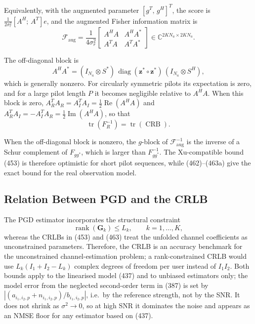 \documentclass[12pt,a4paper]{article}
\begin{document}
Equivalently, with the augmented parameter $[g^T,\,g^H]^T$, the score is
$\frac{1}{2\sigma_r^2}[A^H;\,A^T]e$, and the augmented Fisher
information matrix is
\begin{equation}
\boxed{
\mathcal F_{\mathrm{aug}}
=
\frac{1}{4\sigma_r^2}
\begin{bmatrix}
A^HA & A^HA^*\\
A^TA & A^TA^*
\end{bmatrix}
\in\mathbb C^{2KN_a\times 2KN_a}.
}
\tag{464}
\end{equation}

The off-diagonal block is
\begin{equation}
A^HA^*
=
(I_{N_a}\otimes S^*)\,
\operatorname{diag}(\mathbf z^*\circ\mathbf z^*)\,
(I_{N_a}\otimes S^H),
\tag{464a}
\end{equation}
which is generally nonzero. For circularly symmetric pilots its expectation
is zero, and for a large pilot length $P$ it becomes negligible relative to
$A^HA$. When this block is zero,
$A_R^TA_R=A_I^TA_I=\tfrac12\operatorname{Re}(A^HA)$ and
$A_R^TA_I=-A_I^TA_R=\tfrac12\operatorname{Im}(A^HA)$, so that
\begin{equation}
\operatorname{tr}\!\left(F_R^{-1}\right)
=
\operatorname{tr}\!\left(\operatorname{CRB}\right).
\tag{464b}
\end{equation}

When the off-diagonal block is nonzero, the $g$-block of
$\mathcal F_{\mathrm{aug}}^{-1}$ is the inverse of a Schur complement of
$F_{gg^*}$, which is larger than $F_{gg^*}^{-1}$. The Xu-compatible
bound (453) is therefore optimistic for short pilot sequences, while
(462)--(463a) give the exact bound for the real observation model.

\subsection{Relation Between PGD and the CRLB}

The PGD estimator incorporates the structural constraint
\begin{equation}
\operatorname{rank}(\mathbf G_k)\leq L_k,
\qquad k=1,\ldots,K,
\tag{465}
\end{equation}
whereas the CRLBs in (453) and (463) treat the unfolded channel
coefficients as unconstrained parameters. Therefore, the CRLB is an
accuracy benchmark for the unconstrained channel-estimation problem; a
rank-constrained CRLB would use $L_k(I_1+I_2-L_k)$ complex degrees of
freedom per user instead of $I_1I_2$. Both bounds apply to the
linearised model (437) and to unbiased estimators only; the model error
from the neglected second-order term in (387) is set by
$|(a_{i_1,i_2,p}+n_{i_1,i_2,p})/b_{i_1,i_2,p}|$, i.e.\ by the reference strength,
not by the SNR. It does not shrink as $\sigma^2\to0$, so at high SNR it
dominates the noise and appears as an NMSE floor for any estimator based on (437).
\end{document}
